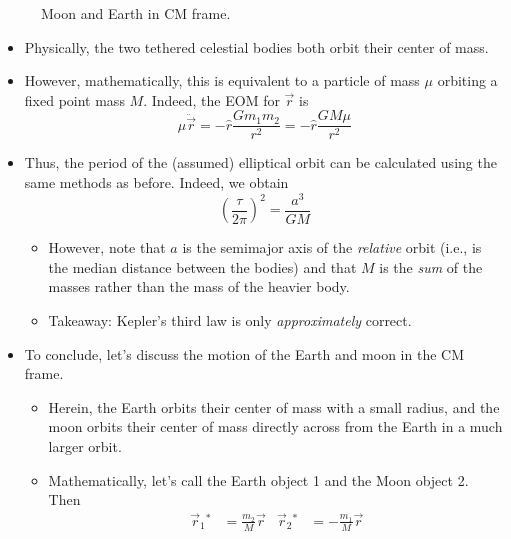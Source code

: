 \documentclass[../notes.tex]{subfiles}
\begin{document}
\begin{itemize}
\begin{figure}[h!]
        \caption{Moon and Earth in CM frame.}
        \label{fig:CMmoonEarth}
    \end{figure}
    \begin{itemize}
        \item Physically, the two tethered celestial bodies both orbit their center of mass.
        \item However, mathematically, this is equivalent to a particle of mass $\mu$ orbiting a fixed point mass $M$. Indeed, the EOM for $\vec{r}$ is
        \begin{equation*}
            \mu\ddot{\vec{r}} = -\hat{r}\frac{Gm_1m_2}{r^2}
            = -\hat{r}\frac{GM\mu}{r^2}
        \end{equation*}
        \item Thus, the period of the (assumed) elliptical orbit can be calculated using the same methods as before. Indeed, we obtain
        \begin{equation*}
            \left( \frac{\tau}{2\pi} \right)^2 = \frac{a^3}{GM}
        \end{equation*}
        \begin{itemize}
            \item However, note that $a$ is the semimajor axis of the \emph{relative} orbit (i.e., is the median distance between the bodies) and that $M$ is the \emph{sum} of the masses rather than the mass of the heavier body.
            \item Takeaway: Kepler's third law is only \emph{approximately} correct.
        \end{itemize}
        \item To conclude, let's discuss the motion of the Earth and moon in the CM frame.
        \begin{itemize}
            \item Herein, the Earth orbits their center of mass with a small radius, and the moon orbits their center of mass directly across from the Earth in a much larger orbit.
            \item Mathematically, let's call the Earth object 1 and the Moon object 2. Then
            \begin{align*}
                \vec{r}_1{}^* &= \frac{m_2}{M}\vec{r}&
                \vec{r}_2{}^* &= -\frac{m_1}{M}\vec{r}

\end{align*}
\end{itemize}
\end{itemize}
\end{itemize}
\end{document}
